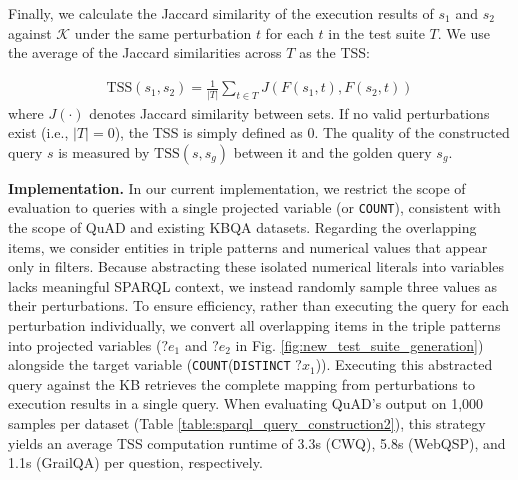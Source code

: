 \documentclass[runningheads]{llncs}
\begin{document}
Finally, we calculate the Jaccard similarity \cite{Jaccard1912THEDO} of the execution results of $s_1$ and $s_2$ against $\mathcal{K}$ under the same perturbation $t$ for each $t$ in the test suite $T$. We use the average of the Jaccard similarities across $T$ as the TSS:

\begin{gather}
\text{TSS}(s_1, s_2) = \frac{1}{|T|}\sum_{t\in T}  J(F(s_1, t),F(s_2, t))
\end{gather}
where $J(\cdot)$ denotes Jaccard similarity between sets. If no valid perturbations exist (i.e., $|T| = 0$), the TSS is simply defined as $0$. The quality of the constructed query $s$ is measured by $\text{TSS}(s, s_g)$ between it and the golden query $s_g$.

\textbf{Implementation.}
In our current implementation, we restrict the scope of evaluation to queries with a single projected variable (or \texttt{COUNT}), consistent with the scope of QuAD and existing KBQA datasets. 
Regarding the overlapping items, we consider entities in triple patterns and numerical values that appear only in filters. 
Because abstracting these isolated numerical literals into variables lacks meaningful SPARQL context, we instead randomly sample three values as their perturbations.
To ensure efficiency, rather than executing the query for each perturbation individually, we convert all overlapping items in the triple patterns into projected variables ($?e_1$ and $?e_2$ in Fig. \ref{fig:new_test_suite_generation}) alongside the target variable (\texttt{COUNT}(\texttt{DISTINCT} $?x_1$)). Executing this abstracted query against the KB retrieves the complete mapping from perturbations to execution results in a single query.
When evaluating QuAD's output on 1,000 samples per dataset (Table \ref{table:sparql_query_construction2}), this strategy yields an average TSS computation runtime of 3.3s (CWQ), 5.8s (WebQSP), and 1.1s (GrailQA) per question, respectively.
\end{document}
